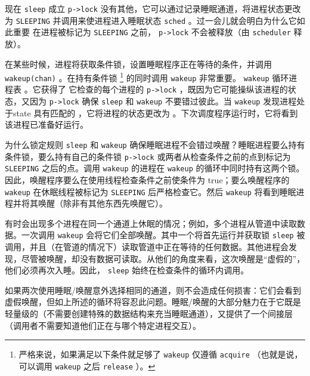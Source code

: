 现在
    \lstinline{sleep}    成立
    \lstinline{p->lock}    没有其他，它可以通过记录睡眠通道，将进程状态更改为    \texttt{SLEEPING}    并调用来使进程进入睡眠状态
    \lstinline{sched}   
        。过一会儿就会明白为什么它如此重要
 在进程被标记为    \texttt{SLEEPING}    之前，   \lstinline{p->lock}    不会被释放（由    \lstinline{scheduler}    释放）。  

在某些时候，进程将获取条件锁，设置睡眠程序正在等待的条件，并调用    \lstinline{wakeup(chan)}    。在持有条件锁    \footnote{严格来说，如果满足以下条件就足够了
    \lstinline{wakeup}    仅遵循
    \lstinline{acquire}   （也就是说，可以调用
    \lstinline{wakeup}    之后
    \lstinline{release}   ）。  }    的同时调用    \lstinline{wakeup}    非常重要。
    \lstinline{wakeup}    循环进程表
        。它获得了
 它检查的每个进程的    \lstinline{p->lock}    ，既因为它可能操纵该进程的状态，又因为
    \lstinline{p->lock}    确保
    \lstinline{sleep}    和
    \lstinline{wakeup}   不要错过彼此。当   \lstinline{wakeup}   发现进程处于state
        具有匹配的
        ，它将进程的状态更改为
        。下次调度程序运行时，它将看到该进程已准备好运行。  

为什么锁定规则
    \lstinline{sleep}    和
    \lstinline{wakeup}    确保睡眠进程不会错过唤醒？睡眠进程要么持有条件锁，要么持有自己的条件锁
    \lstinline{p->lock}    或两者从检查条件之前的点到标记为    \texttt{SLEEPING}    之后的点。调用    \texttt{wakeup}    的进程在    \texttt{wakeup}    的循环中同时持有这两个锁。因此，唤醒程序要么在使用线程检查条件之前使条件为 true；要么唤醒程序的    \lstinline{wakeup}    在休眠线程被标记为    \texttt{SLEEPING}    后严格检查它。然后
    \lstinline{wakeup}    将看到睡眠进程并将其唤醒（除非有其他东西先唤醒它）。  

有时会出现多个进程在同一个通道上休眠的情况；例如，多个进程从管道中读取数据。一次调用
    \lstinline{wakeup}    会将它们全部唤醒。其中一个将首先运行并获取锁
    \lstinline{sleep}    被调用，并且（在管道的情况下）读取管道中正在等待的任何数据。其他进程会发现，尽管被唤醒，却没有数据可读取。从他们的角度来看，这次唤醒是“虚假的”，他们必须再次入睡。因此，   \lstinline{sleep}    始终在检查条件的循环内调用。  

如果两次使用睡眠/唤醒意外选择相同的通道，则不会造成任何损害：它们会看到虚假唤醒，但如上所述的循环将容忍此问题。睡眠/唤醒的大部分魅力在于它既是轻量级的（不需要创建特殊的数据结构来充当睡眠通道），又提供了一个间接层（调用者不需要知道他们正在与哪个特定进程交互）。

